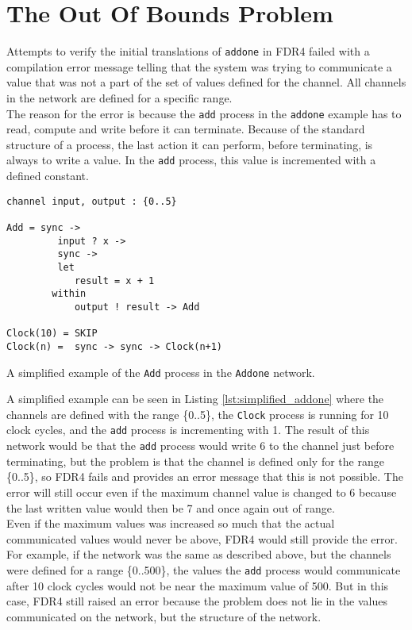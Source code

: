 \section{The Out Of Bounds Problem}
Attempts to verify the initial \cspm{} translations of \texttt{addone} in FDR4 failed with a compilation error message telling that the system was trying to communicate a value that was not a part of the set of values defined for the channel. All channels in the network are defined for a specific range. \\

The reason for the error is because the \texttt{add} process in the \texttt{addone} example has to read, compute and write before it can terminate. Because of the standard structure of a process, the last action it can perform, before terminating, is always to write a value. In the \texttt{add} process, this value is incremented with a defined constant.\\

\begin{listing}
\begin{verbatim}
channel input, output : {0..5}

Add = sync ->
         input ? x ->
         sync ->
         let
            result = x + 1
        within
            output ! result -> Add

Clock(10) = SKIP
Clock(n) =  sync -> sync -> Clock(n+1)
\end{verbatim}
\caption{A simplified example of the \texttt{Add} process in the \texttt{Addone} network.}
\label{lst:simplified_addone}
\end{listing}
A simplified example can be seen in Listing \ref{lst:simplified_addone} where the channels are defined with the range \{0..5\}, the \texttt{Clock} process is running for 10 clock cycles, and the \texttt{add} process is incrementing with 1.
The result of this network would be that the \texttt{add} process would write 6 to the channel just before terminating, but the problem is that the channel is defined only for the range \{0..5\}, so FDR4 fails and provides an error message that this is not possible. The error will still occur even if the maximum channel value is changed to 6 because the last written value would then be 7 and once again out of range. \\

Even if the maximum values was increased so much that the actual communicated values would never be above, FDR4 would still provide the error.
For example, if the network was the same as described above, but the channels were defined for a range \{0..500\}, the values the \texttt{add} process would communicate after 10 clock cycles would not be near the maximum value of 500. But in this case, FDR4 still raised an error because the problem does not lie in the values communicated on the network, but the structure of the network. \\

